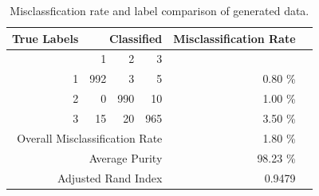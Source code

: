 \documentclass[12pt,letterpaper]{article}
\numberwithin{equation}{section}
\numberwithin{equation}{section}
\numberwithin{equation}{section}
\begin{document}
\begin{table}[!htb]
\begin{center}
\caption{Misclassfication rate and label comparison of generated data.}
\label{misclassTable}
\begin{tabular}{r| r r r| r r}
\hline
    True Labels       &  \multicolumn{3}{r}{ Classified }  \vline & Misclassification Rate  &  \\ \hline
   & 1                              & 2   & 3   &                            &  \\ \hline
 1              & 992                            & 3   & 5   & 0.80 \%                                      &  \\
 2              & 0                              & 990 & 10  & 1.00 \%                                       &  \\
 3              & 15                             & 20  & 965 & 3.50 \%                                      &  \\  \hline
                \multicolumn{4}{r}{Overall Misclassification Rate}        & 1.80 \%                  & \\
        		\multicolumn{4}{r}{Average Purity} & 98.23 \%  
        		\\ \hline
                \multicolumn{4}{r}{Adjusted Rand Index} & 0.9479 &  \\
    \hline
\end{tabular}
\end{center}
\end{table}
\end{document}
